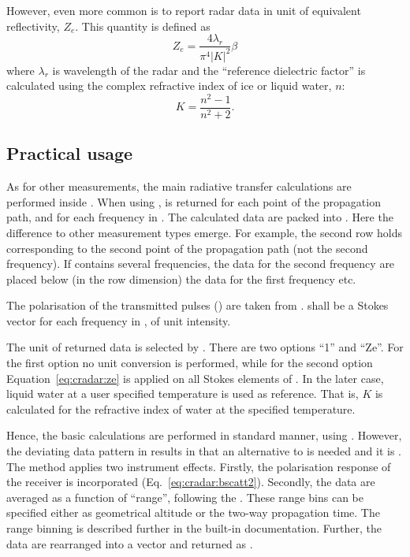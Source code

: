 However, even more common is to report radar data in unit of equivalent
reflectivity, $Z_e$. This quantity is defined as \citep[e.g.][]{donovan:01}
\begin{equation}
  \label{eq:cradar:ze}
  Z_e = \frac{4\lambda_r}{\pi^4|K|^2}\beta
\end{equation}
where $\lambda_r$ is wavelength of the radar and the ``reference dielectric
factor'' is calculated using the complex refractive index of ice or liquid
water, $n$:
\begin{equation}
  K = \frac{n^2-1}{n^2+2}.
\end{equation}



\subsection{Practical usage}
\label{sec:cradar:usage}

As for other measurements, the main radiative transfer calculations are
performed inside . When using
,  is returned
for each point of the propagation path, and for each frequency in
. The calculated data are packed into . Here
the difference to other measurement types emerge. For example, the second row
holds  corresponding to the second point of the propagation path
(not the second frequency). If  contains several
frequencies, the data for the second frequency are placed below (in the row
dimension) the data for the first frequency etc. 

The polarisation of the transmitted pulses () are taken from
.  shall be a Stokes
vector for each frequency in , of unit intensity.

The unit of returned data is selected by . There are two
options ``1'' and ``Ze''. For the first option no unit conversion is performed,
while for the second option Equation~\ref{eq:cradar:ze} is applied on all
Stokes elements of . In the later case, liquid water at a user
specified temperature is used as reference. That is, $K$ is calculated for the
refractive index of water at the specified temperature.

Hence, the basic calculations are performed in standard manner, using
. However, the deviating data pattern in
 results in that an alternative to  is needed
and it is . The method applies two instrument effects.
Firstly, the polarisation response of the receiver is incorporated
(Eq.~\ref{eq:cradar:bscatt2}). Secondly, the data are averaged as a
function of ``range'', following the . These range bins
can be specified either as geometrical altitude or the two-way propagation time.
The range binning is described further in the built-in documentation.
Further, the data are rearranged into a vector and returned as .

